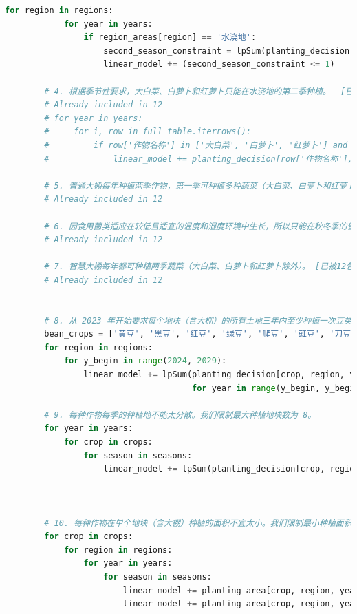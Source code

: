 \documentclass[withoutpreface]{cumcmthesis}
\begin{document}
\begin{appendices}
\begin{lstlisting}[language=python]
        for region in regions:
            for year in years:
                if region_areas[region] == '水浇地':
                    second_season_constraint = lpSum(planting_decision[(crop, region, year, '第二季')] for crop in second_season_allowed_crops)
                    linear_model += (second_season_constraint <= 1)
    
        # 4. 根据季节性要求，大白菜、白萝卜和红萝卜只能在水浇地的第二季种植。  [已被12包含]
        # Already included in 12
        # for year in years:
        #     for i, row in full_table.iterrows():
        #         if row['作物名称'] in ['大白菜', '白萝卜', '红萝卜'] and row['地块类型'] == '水浇地':
        #             linear_model += planting_decision[row['作物名称'], row['种植地块'], year, '第一季'] == 0            
    
        # 5. 普通大棚每年种植两季作物，第一季可种植多种蔬菜（大白菜、白萝卜和红萝卜除外），第二季只能种植食用菌。[已被12包含]
        # Already included in 12
    
        # 6. 因食用菌类适应在较低且适宜的温度和湿度环境中生长，所以只能在秋冬季的普通大棚里种植。 [已被12包含]
        # Already included in 12
    
        # 7. 智慧大棚每年都可种植两季蔬菜（大白菜、白萝卜和红萝卜除外）。 [已被12包含]
        # Already included in 12
    
    
        # 8. 从 2023 年开始要求每个地块（含大棚）的所有土地三年内至少种植一次豆类作物。
        bean_crops = ['黄豆', '黑豆', '红豆', '绿豆', '爬豆', '豇豆', '刀豆', '芸豆']
        for region in regions:
            for y_begin in range(2024, 2029):
                linear_model += lpSum(planting_decision[crop, region, year, season] for crop in bean_crops 
                                      for year in range(y_begin, y_begin + 3) for season in seasons) >= 1
    
        # 9. 每种作物每季的种植地不能太分散。我们限制最大种植地块数为 8。
        for year in years:
            for crop in crops:
                for season in seasons:
                    linear_model += lpSum(planting_decision[crop, region, year, season] for region in regions) <= 8
    
    
    
        # 10. 每种作物在单个地块（含大棚）种植的面积不宜太小。我们限制最小种植面积为 30%。
        for crop in crops:
            for region in regions:
                for year in years:
                    for season in seasons:
                        linear_model += planting_area[crop, region, year, season] >= 0.3 * region_areas[region] * planting_decision[crop, region, year, season]
                        linear_model += planting_area[crop, region, year, season] <= region_areas[region] * planting_decision[crop, region, year, season]
    

\end{lstlisting}
\end{appendices}
\end{document}
